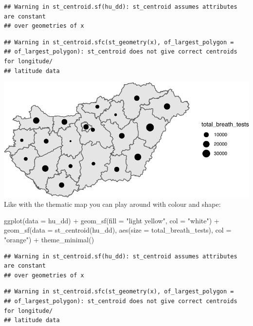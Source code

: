 \documentclass[
]{book}
\newenvironment{Shaded}{\begin{snugshade}}{\end{snugshade}}
\newcommand{\AttributeTok}[1]{\textcolor[rgb]{0.77,0.63,0.00}{#1}}
\newcommand{\FunctionTok}[1]{\textcolor[rgb]{0.00,0.00,0.00}{#1}}
\newcommand{\NormalTok}[1]{#1}
\newcommand{\SpecialCharTok}[1]{\textcolor[rgb]{0.00,0.00,0.00}{#1}}
\newcommand{\StringTok}[1]{\textcolor[rgb]{0.31,0.60,0.02}{#1}}
\begin{document}
\begin{verbatim}
## Warning in st_centroid.sf(hu_dd): st_centroid assumes attributes are constant
## over geometries of x
\end{verbatim}

\begin{verbatim}
## Warning in st_centroid.sfc(st_geometry(x), of_largest_polygon =
## of_largest_polygon): st_centroid does not give correct centroids for longitude/
## latitude data
\end{verbatim}

\includegraphics{crime_mapping_files/figure-latex/gradsymbmap-1.pdf}
Like with the thematic map you can play around with colour and shape:

\begin{Shaded}
\begin{Highlighting}[]
\FunctionTok{ggplot}\NormalTok{(}\AttributeTok{data =}\NormalTok{ hu\_dd) }\SpecialCharTok{+} 
  \FunctionTok{geom\_sf}\NormalTok{(}\AttributeTok{fill =} \StringTok{"light yellow"}\NormalTok{, }\AttributeTok{col =} \StringTok{"white"}\NormalTok{) }\SpecialCharTok{+} 
  \FunctionTok{geom\_sf}\NormalTok{(}\AttributeTok{data =} \FunctionTok{st\_centroid}\NormalTok{(hu\_dd), }\FunctionTok{aes}\NormalTok{(}\AttributeTok{size =}\NormalTok{ total\_breath\_tests), }\AttributeTok{col =} \StringTok{"orange"}\NormalTok{) }\SpecialCharTok{+} 
  \FunctionTok{theme\_minimal}\NormalTok{()}
\end{Highlighting}
\end{Shaded}

\begin{verbatim}
## Warning in st_centroid.sf(hu_dd): st_centroid assumes attributes are constant
## over geometries of x
\end{verbatim}

\begin{verbatim}
## Warning in st_centroid.sfc(st_geometry(x), of_largest_polygon =
## of_largest_polygon): st_centroid does not give correct centroids for longitude/
## latitude data
\end{verbatim}
\end{document}

